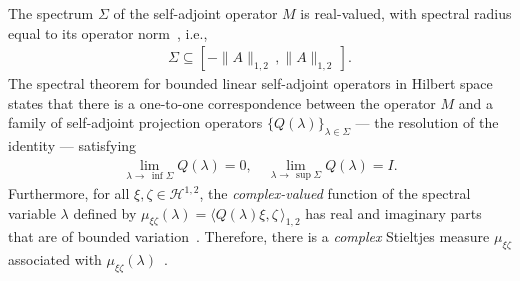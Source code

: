 \documentclass[english,12pt,jmp,graphicx]{revtex4-1}
\newcommand{\Hs}{\mathscr{H}}
\newcommand{\Hm}{\mathsf{H}}
\begin{document}
The spectrum $\Sigma$ of the self-adjoint 
operator $M$ is real-valued, with spectral
radius equal to its operator norm~\cite{Reed-1980}, i.e.,
%
\begin{align}\label{eq:Spectral_Radius_Sobolev}
  \Sigma\subseteq[-\|A\|_{1,2}\,,\|A\|_{1,2}\,].
\end{align}
%
The spectral theorem for bounded linear self-adjoint operators in
Hilbert space states that there is a one-to-one correspondence between
the operator $M$ and a family of self-adjoint projection operators
$\{Q(\lambda)\}_{\lambda\in\Sigma}$ --- the resolution of the identity ---
satisfying~\cite{Stone:64} 
%
\begin{align}\label{eq:Res_Identity}
  \lim_{\lambda\to\,\inf{\Sigma}}Q(\lambda)=0,
  \quad
  \lim_{\lambda\to\,\sup{\Sigma}}Q(\lambda)=I.
\end{align}
%
Furthermore, for all  
$\xi,\zeta\in\Hs^{1,2}$, the \emph{complex-valued} function of the
spectral variable $\lambda$
defined by $\mu_{\xi\zeta}(\lambda)=\langle
Q(\lambda)\xi,\zeta\,\rangle_{1,2}$ has real and 
imaginary parts that are of bounded variation~\cite{Stone:64}. Therefore, there
is a \emph{complex} Stieltjes measure $\mu_{\xi\zeta}$ associated with
$\mu_{\xi\zeta}(\lambda)$~\cite{Stieltjes:1995,Stone:64,Folland:99:RealAnalysis}.
\end{document}
